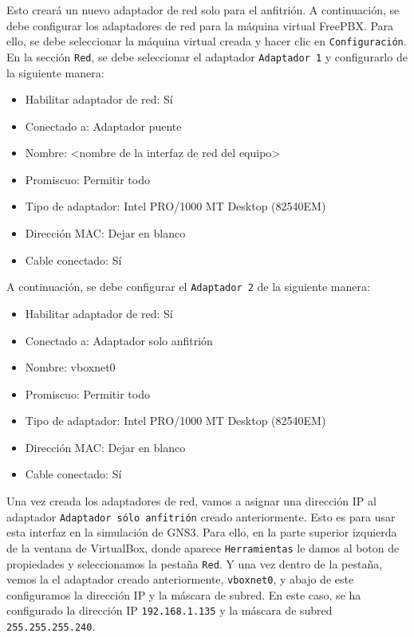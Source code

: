 \noindent
Esto creará un nuevo adaptador de red solo para el anfitrión. A continuación, se debe configurar los adaptadores de red para la máquina virtual FreePBX. Para ello, se debe seleccionar la máquina virtual creada y hacer clic en \texttt{Configuración}. En la sección \texttt{Red}, se debe seleccionar el adaptador \texttt{Adaptador 1} y configurarlo de la siguiente manera:
\begin{multicols}{2}
\begin{itemize}
		\item Habilitar adaptador de red: Sí
		\item Conectado a: Adaptador puente
		\item Nombre: <nombre de la interfaz de red del equipo>
		\item Promiscuo: Permitir todo
\end{itemize}

\columnbreak

\begin{itemize}
		\item Tipo de adaptador: Intel PRO/1000 MT Desktop (82540EM)
		\item Dirección MAC: Dejar en blanco
		\item Cable conectado: Sí
\end{itemize}
\end{multicols}

\noindent
A continuación, se debe configurar el \texttt{Adaptador 2} de la siguiente manera:
\begin{multicols}{2}
\begin{itemize}
		\item Habilitar adaptador de red: Sí
		\item Conectado a: Adaptador solo anfitrión
		\item Nombre: vboxnet0
		\item Promiscuo: Permitir todo
\end{itemize}

\columnbreak

\begin{itemize}
		\item Tipo de adaptador: Intel PRO/1000 MT Desktop (82540EM)
		\item Dirección MAC: Dejar en blanco
		\item Cable conectado: Sí
\end{itemize}
\end{multicols}

\noindent
Una vez creada los adaptadores de red, vamos a asignar una dirección IP al adaptador \texttt{Adaptador sólo anfitrión} creado anteriormente. Esto es para usar esta interfaz en la simulación de GNS3.
Para ello, en la parte superior izquierda de la ventana de VirtualBox, donde aparece \texttt{Herramientas} le damos al boton de propiedades y seleccionamos la pestaña \texttt{Red}. Y una vez dentro de
la pestaña, vemos la el adaptador creado anteriormente, \texttt{vboxnet0}, y abajo de este configuramos la dirección IP y la máscara de subred. En este caso, se ha configurado la dirección IP 
\texttt{192.168.1.135} y la máscara de subred \texttt{255.255.255.240}.

